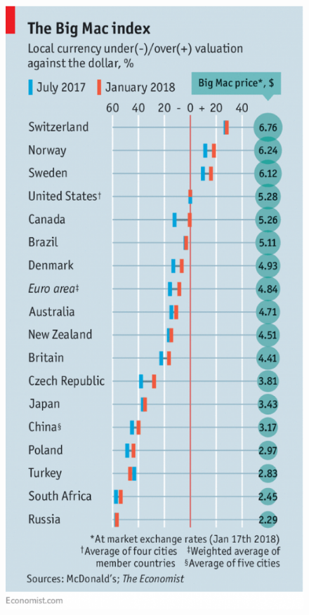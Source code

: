 \documentclass{beamer}
\begin{document}
\begin{frame}
  \begin{figure}
    \includegraphics[scale=.2]{big_mac_index.eps}
  \end{figure}
\end{frame}
\end{document}
